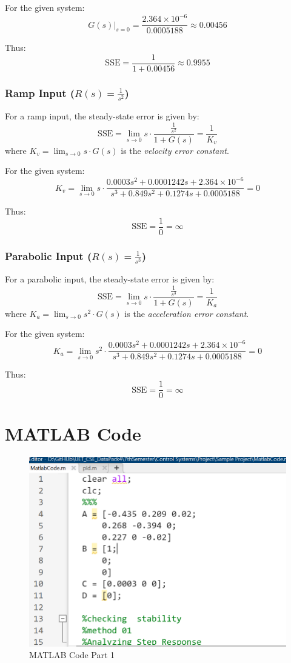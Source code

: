 \documentclass{article}
\begin{document}
For the given system:
\[
G(s) \big|_{s = 0} = \frac{2.364 \times 10^{-6}}{0.0005188} \approx 0.00456
\]

Thus:
\[
\text{SSE} = \frac{1}{1 + 0.00456} \approx 0.9955
\]


\subsubsection{Ramp Input (\( R(s) = \frac{1}{s^2} \))}

For a ramp input, the steady-state error is given by:
\[
\text{SSE} = \lim_{s \to 0} s \cdot \frac{\frac{1}{s^2}}{1 + G(s)} = \frac{1}{K_v}
\]
where \( K_v = \lim_{s \to 0} s \cdot G(s) \) is the \textit{velocity error constant}.

For the given system:
\[
K_v = \lim_{s \to 0} s \cdot \frac{0.0003 s^2 + 0.0001242 s + 2.364 \times 10^{-6}}{s^3 + 0.849 s^2 + 0.1274 s + 0.0005188} = 0
\]

Thus:
\[
\text{SSE} = \frac{1}{0} = \infty
\]



\subsubsection{Parabolic Input (\( R(s) = \frac{1}{s^3} \))}

For a parabolic input, the steady-state error is given by:
\[
\text{SSE} = \lim_{s \to 0} s \cdot \frac{\frac{1}{s^3}}{1 + G(s)} = \frac{1}{K_a}
\]
where \( K_a = \lim_{s \to 0} s^2 \cdot G(s) \) is the \textit{acceleration error constant}.

For the given system:
\[
K_a = \lim_{s \to 0} s^2 \cdot \frac{0.0003 s^2 + 0.0001242 s + 2.364 \times 10^{-6}}{s^3 + 0.849 s^2 + 0.1274 s + 0.0005188} = 0
\]

Thus:
\[
\text{SSE} = \frac{1}{0} = \infty
\]

\section{MATLAB Code}
\begin{figure}[h!]
	\centering
	\includegraphics[scale=0.85]{images/MatlabCode1.png}
	\caption{MATLAB Code Part 1}
	\label{fig:MatlabCode2}
\end{figure}
\end{document}
